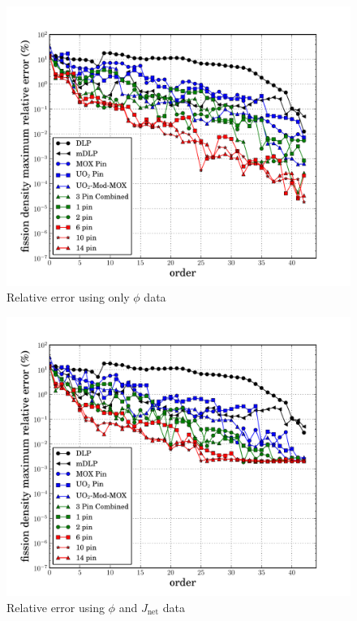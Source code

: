 \documentclass{anstrans}
\begin{document}
\begin{figure}[htb]
 \centering
 \includegraphics[trim=.5cm .25cm 1.5cm 1.25cm, clip=true, totalheight=0.28\textheight]{phi}
 \caption{Relative error using only $\phi$ data}
 \label{fig:phi}
\end{figure}

\begin{figure}[htb]
 \centering
 \includegraphics[trim=.5cm .25cm 1.5cm 1.25cm, clip=true, totalheight=0.28\textheight]{netcurrent}
 \caption{Relative error using $\phi$ and $J_{\text{net}}$ data}
 \label{fig:totalcurrent}
\end{figure}
\end{document}
